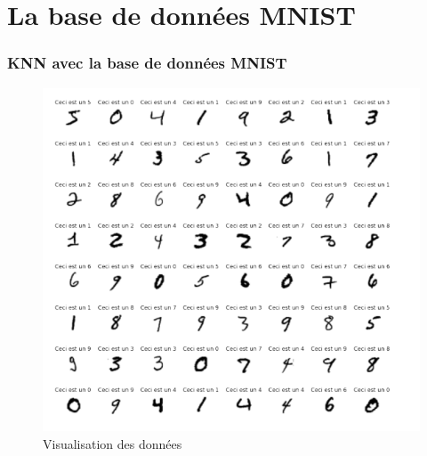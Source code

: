 \documentclass{beamer}
\theoremstyle{definition}
\begin{document}
\section{La base de données MNIST}
\begin{frame}
	\frametitle{KNN avec la base de données MNIST}
		\begin{minipage}[c]{1\linewidth}
		\begin{minipage}[c]{0.5\linewidth}\centering\begin{figure}
				\centering
				\includegraphics[scale=0.28]{MNIST.png}
				\caption*{Visualisation des données}
				

\end{figure}
\end{minipage}
\end{minipage}
\end{frame}
\end{document}
